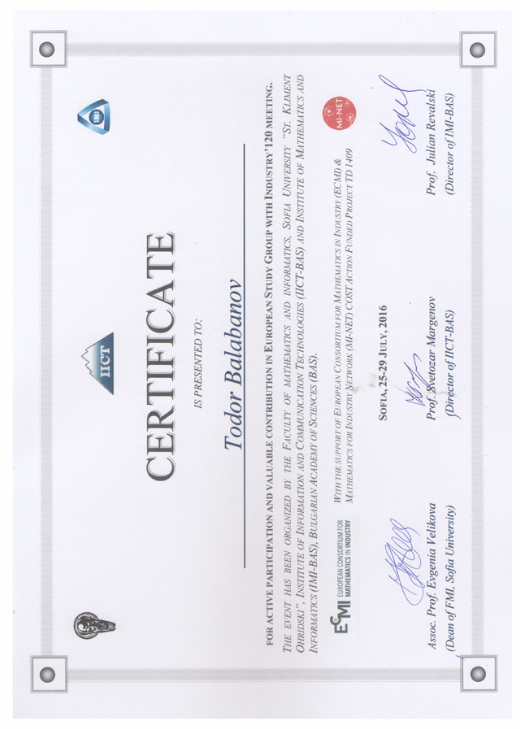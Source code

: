 \documentclass[english,a4paper]{europasscv}
\begin{document}
\includegraphics[width=\textwidth,height=\textheight,keepaspectratio]{ESGI1202016}
\end{document}
